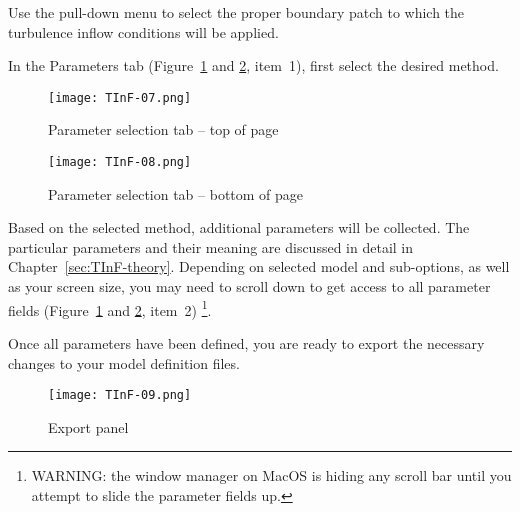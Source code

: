 \begin{description}
Use the pull-down menu to select the proper boundary patch to which the turbulence inflow conditions will be applied.


\item[Step~2: Parameter Definition] 
In the Parameters tab (Figure~\ref{fig:TInF07} and  \ref{fig:TInF08}, item~1), first select the desired method.

\begin{figure}[htp]
	\begin{center}
		\vspace*{-1.0\baselineskip}
		\texttt{[image: TInF-07.png]}
		\vspace*{-1.5\baselineskip}
		\caption{Parameter selection tab -- top of page}
		\label{fig:TInF07}
	\end{center}
\end{figure}
\begin{figure}[htp]
	\begin{center}
		\vspace*{-1.0\baselineskip}
		\texttt{[image: TInF-08.png]}
		\vspace*{-1.5\baselineskip}
		\caption{Parameter selection tab -- bottom of page}
		\label{fig:TInF08}
	\end{center}
\end{figure}


Based on the selected method, additional parameters will be collected.  The particular parameters and their meaning are discussed in detail in Chapter~\ref{sec:TInF-theory}.
Depending on selected model and sub-options, as well as your screen size, you may need to scroll down to get access to all parameter fields (Figure~\ref{fig:TInF07} and  \ref{fig:TInF08}, item~2)  \footnote{WARNING: the window manager on MacOS is hiding any scroll bar until you attempt to slide the parameter fields up.}.

\item[Step~3: Export Changes to your Model] 

Once all parameters have been defined, you are ready to export the necessary changes to your model definition files.

\begin{figure}[h]
	\begin{center}
		\vspace*{-1.0\baselineskip}
		\texttt{[image: TInF-09.png]}
		\vspace*{-1.5\baselineskip}
		\caption{Export panel}
		\label{fig:TInF09}
	\end{center}
\end{figure}


\end{description}
